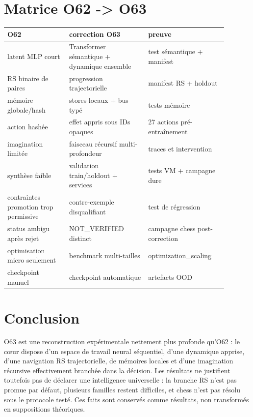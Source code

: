 \documentclass[11pt,a4paper]{article}
\begin{document}
\section{Matrice O62 -> O63}
\begin{longtable}{p{0.25\linewidth}p{0.32\linewidth}p{0.32\linewidth}}
\toprule
O62 & correction O63 & preuve\\
\midrule
latent MLP court & Transformer sémantique + dynamique ensemble & test sémantique + manifest\\
RS binaire de paires & progression trajectorielle & manifest RS + holdout\\
mémoire globale/hash & stores locaux + bus typé & tests mémoire\\
action hashée & effet appris sous IDs opaques & 27 actions pré-entraînement\\
imagination limitée & faisceau récursif multi-profondeur & traces et intervention\\
synthèse faible & validation train/holdout + services & tests VM + campagne dure\\
contraintes promotion trop permissive & contre-exemple disqualifiant & test de régression\\
status ambigu après rejet & NOT\_VERIFIED distinct & campagne chess post-correction\\
optimisation micro seulement & benchmark multi-tailles & optimization\_scaling\\
checkpoint manuel & checkpoint automatique & artefacts OOD\\
\bottomrule
\end{longtable}

\section{Conclusion}
O63 est une reconstruction expérimentale nettement plus profonde qu’O62 : le cœur dispose d’un espace de travail neural séquentiel, d’une dynamique apprise, d’une navigation RS trajectorielle, de mémoires locales et d’une imagination récursive effectivement branchée dans la décision. Les résultats ne justifient toutefois pas de déclarer une intelligence universelle : la branche RS n’est pas promue par défaut, plusieurs familles restent difficiles, et chess n’est pas résolu sous le protocole testé. Ces faits sont conservés comme résultats, non transformés en suppositions théoriques.
\end{document}
